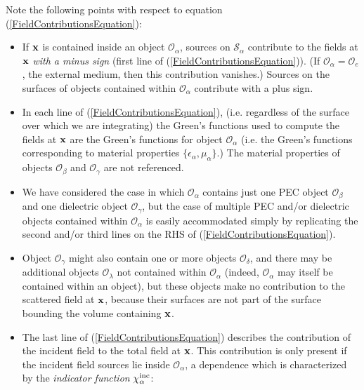 \documentclass[letterpaper]{article}
\begin{document}
Note the following points with respect to equation
(\ref{FieldContributionsEquation}):
\begin{itemize}
  \item If $\mathbf{x}$ is contained inside an object 
        $\mathcal{O}_\alpha$, sources on $\mathcal{S}_\alpha$
        contribute to the fields at $\mathbf{x}$ 
        \textit{with a minus sign} (first line of 
        (\ref{FieldContributionsEquation})). 
        (If $\mathcal{O}_\alpha=\mathcal{O}_e$, 
         the external medium, then this contribution vanishes.) 
        Sources on the surfaces of objects contained within 
        $\mathcal{O}_\alpha$ contribute with a plus sign.

  \item In each line of (\ref{FieldContributionsEquation}), 
        (i.e. regardless of the surface over which we are 
        integrating) the Green's functions used to compute
        the fields at $\mathbf{x}$ are the Green's functions for
        object $\mathcal{O}_\alpha$ (i.e. the Green's functions
        corresponding to material properties 
        $\{\epsilon_\alpha,\mu_\alpha\}$.) The material properties
        of objects $\mathcal{O}_\beta$ and $\mathcal{O}_\gamma$
        are not referenced.

  \item We have considered the case in which $\mathcal{O}_\alpha$
        contains just one PEC object $\mathcal{O}_\beta$ 
        and one dielectric object $\mathcal{O}_\gamma$, but 
        the case of multiple PEC and/or dielectric objects contained
        within $\mathcal{O}_\alpha$ is easily accommodated simply 
        by replicating the second and/or third lines on the RHS of 
        (\ref{FieldContributionsEquation}).

  \item Object $\mathcal{O}_\gamma$ might also contain one
        or more objects $\mathcal{O}_\delta$, and there
        may be additional objects $\mathcal{O}_\lambda$ not 
        contained within $\mathcal{O}_\alpha$ 
        (indeed, $\mathcal{O}_\alpha$ may itself be contained within
        an object), but these objects make no contribution
        to the scattered field at $\mathbf{x}$, because their surfaces are 
        not part of the surface bounding the volume containing $\mathbf{x}$.

  \item The last line of (\ref{FieldContributionsEquation}) describes
        the contribution of the incident field to the total field at 
        $\mathbf{x}$.  This contribution is only present if the incident 
        field sources lie inside $\mathcal{O}_\alpha$, a dependence
        which is characterized by the \textit{indicator function}
        $\chi^{\hbox{\scriptsize{inc}}}_\alpha$:


\end{itemize}
\end{document}
